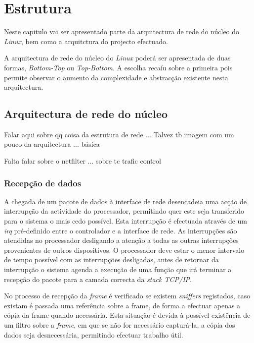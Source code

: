 \chapter{Estrutura}
\label{cap:Estrutura}


Neste capitulo vai ser apresentado parte da arquitectura de rede do núcleo do \textit{Linux}, bem como a arquitctura do projecto efectuado.

A arquitectura de rede do núcleo do \textit{Linux} poderá ser apresentada de duas formas, \textit{Bottom-Top} ou \textit{Top-Bottom}. A escolha recaíu sobre a primeira pois permite observar o aumento da complexidade e abstracção existente nesta arquitectura. 

\section{Arquitectura de rede do núcleo}

Falar aqui sobre qq coisa da estrutura de rede ... 
Talvez tb imagem com um pouco da arquitectura ... básica 

Falta falar sobre o netfilter ... sobre tc trafic control

\subsection{Recepção de dados}

A chegada de um pacote de dados à interface de rede desencadeia uma acção de interrupção da actividade do processador, permitindo quer este seja transferido para o sistema o mais cedo possível. Esta interrupção é efectuada através de um \textit{irq} pré-definido entre o controlador e a interface de rede. As interrupções são atendidas no processador desligando a atenção a todas as outras interrupções provenientes de outros dispositivos. %
O processador deve estar o menor intervalo de tempo possível com as interrupções desligadas, antes de retornar da interrupção o sistema agenda a execução de uma função que irá terminar a recepção do pacote para a camada correcta da \textit{stack TCP/IP}.%

No processo de recepção da \textit{frame} é verificado se existem \textit{sniffers} registados, caso existam é passada uma referência sobre a frame, de forma a efectuar apenas a cópia da frame quando necessária. Esta situação é devida à possível existência de um filtro sobre a \textit{frame}, em que se não for necessário capturá-la, a cópia dos dados seja desnecessária, permitindo efectuar trabalho útil.

